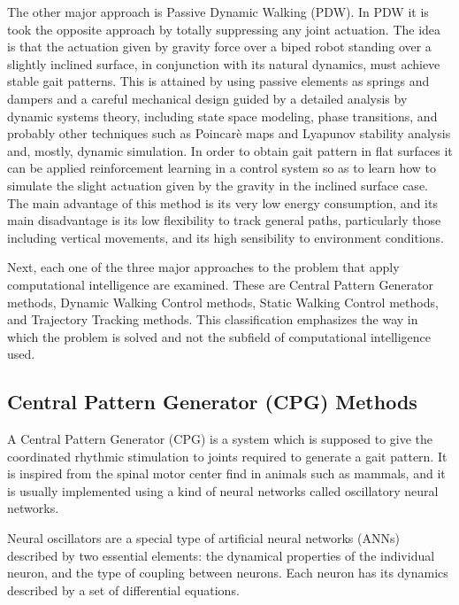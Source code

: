 The other major approach is Passive Dynamic Walking (PDW). In PDW it
is took the opposite approach by totally suppressing any joint
actuation. The idea is that the actuation given by gravity force over
a biped robot standing over a slightly inclined surface, in
conjunction with its natural dynamics, must achieve stable gait
patterns. This is attained by using passive elements as springs and
dampers and a careful mechanical design guided by a detailed analysis
by dynamic systems theory, including state space modeling, phase
transitions, and probably other techniques such as Poincarè maps and
Lyapunov stability analysis and, mostly, dynamic simulation. In order
to obtain gait pattern in flat surfaces it can be applied
reinforcement learning in a control system so as to learn how to
simulate the slight actuation given by the gravity in the inclined
surface case. The main advantage of this method is its very low energy
consumption, and its main disadvantage is its low flexibility to track
general paths, particularly those including vertical movements, and
its high sensibility to environment conditions.

Next, each one of the three major approaches to the problem that apply
computational intelligence are examined. These are Central Pattern
Generator methods, Dynamic Walking Control methods, Static Walking
Control methods, and Trajectory Tracking methods. This classification
emphasizes the way in which the problem is solved and not the subfield
of computational intelligence used.

\subsection{Central Pattern Generator (CPG) Methods}
A Central Pattern Generator (CPG) is a system which is supposed to
give the coordinated rhythmic stimulation to joints required to
generate a gait pattern. It is inspired from the spinal motor center
find in animals such as mammals, and it is usually implemented using a
kind of neural networks called oscillatory neural networks.


Neural oscillators are a special type of artificial neural networks
(ANNs) described by two essential elements: the dynamical properties
of the individual neuron, and the type of coupling between
neurons. Each neuron has its dynamics described by a set of
differential equations.




